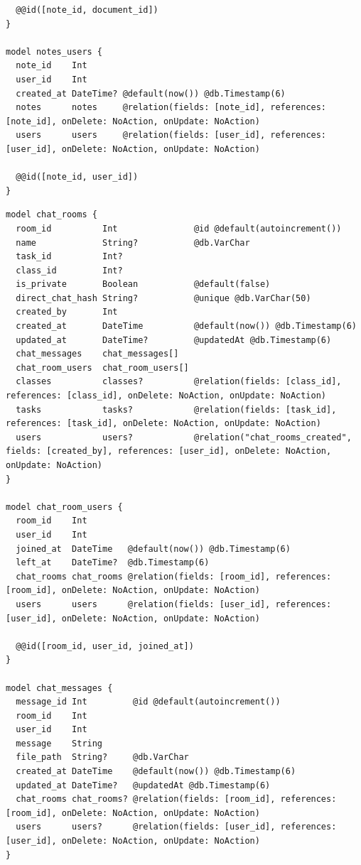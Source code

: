 \begin{listing}[H]
\begin{verbatim}
  @@id([note_id, document_id])
}

model notes_users {
  note_id    Int
  user_id    Int
  created_at DateTime? @default(now()) @db.Timestamp(6)
  notes      notes     @relation(fields: [note_id], references: [note_id], onDelete: NoAction, onUpdate: NoAction)
  users      users     @relation(fields: [user_id], references: [user_id], onDelete: NoAction, onUpdate: NoAction)

  @@id([note_id, user_id])
}
\end{verbatim}
\caption{Prisma -- Dokumenten- und Notizmodelle}
\label{lst:prisma_documents_notes}
\end{listing}

\begin{listing}[H]
\begin{verbatim}
model chat_rooms {
  room_id          Int               @id @default(autoincrement())
  name             String?           @db.VarChar
  task_id          Int?
  class_id         Int?
  is_private       Boolean           @default(false)
  direct_chat_hash String?           @unique @db.VarChar(50)
  created_by       Int
  created_at       DateTime          @default(now()) @db.Timestamp(6)
  updated_at       DateTime?         @updatedAt @db.Timestamp(6)
  chat_messages    chat_messages[]
  chat_room_users  chat_room_users[]
  classes          classes?          @relation(fields: [class_id], references: [class_id], onDelete: NoAction, onUpdate: NoAction)
  tasks            tasks?            @relation(fields: [task_id], references: [task_id], onDelete: NoAction, onUpdate: NoAction)
  users            users?            @relation("chat_rooms_created", fields: [created_by], references: [user_id], onDelete: NoAction, onUpdate: NoAction)
}

model chat_room_users {
  room_id    Int
  user_id    Int
  joined_at  DateTime   @default(now()) @db.Timestamp(6)
  left_at    DateTime?  @db.Timestamp(6)
  chat_rooms chat_rooms @relation(fields: [room_id], references: [room_id], onDelete: NoAction, onUpdate: NoAction)
  users      users      @relation(fields: [user_id], references: [user_id], onDelete: NoAction, onUpdate: NoAction)

  @@id([room_id, user_id, joined_at])
}

model chat_messages {
  message_id Int         @id @default(autoincrement())
  room_id    Int
  user_id    Int
  message    String
  file_path  String?     @db.VarChar
  created_at DateTime    @default(now()) @db.Timestamp(6)
  updated_at DateTime?   @updatedAt @db.Timestamp(6)
  chat_rooms chat_rooms? @relation(fields: [room_id], references: [room_id], onDelete: NoAction, onUpdate: NoAction)
  users      users?      @relation(fields: [user_id], references: [user_id], onDelete: NoAction, onUpdate: NoAction)
}


\end{verbatim}
\end{listing}
